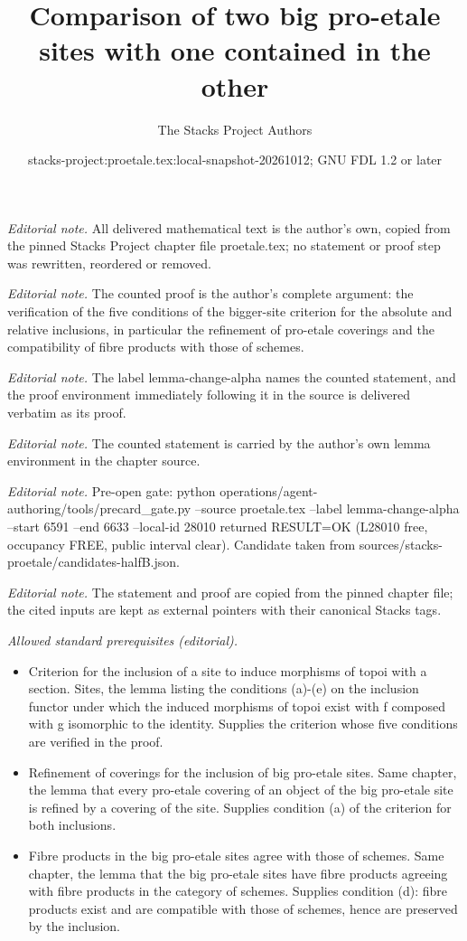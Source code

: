 \documentclass[10pt,a4paper]{amsart}
\title{Comparison of two big pro-etale sites with one contained in the other}
\author{The Stacks Project Authors}
\date{stacks-project:proetale.tex:local-snapshot-20261012; GNU FDL 1.2 or later}
\theoremstyle{plain}
\theoremstyle{definition}
\theoremstyle{remark}
\numberwithin{equation}{subsection}
\begin{document}
\maketitle
\noindent\textit{Editorial note.} All delivered mathematical text is the author's own, copied from the pinned Stacks Project chapter file proetale.tex; no statement or proof step was rewritten, reordered or removed.\par\medskip
\noindent\textit{Editorial note.} The counted proof is the author's complete argument: the verification of the five conditions of the bigger-site criterion for the absolute and relative inclusions, in particular the refinement of pro-etale coverings and the compatibility of fibre products with those of schemes.\par\medskip
\noindent\textit{Editorial note.} The label lemma-change-alpha names the counted statement, and the proof environment immediately following it in the source is delivered verbatim as its proof.\par\medskip
\noindent\textit{Editorial note.} The counted statement is carried by the author's own lemma environment in the chapter source.\par\medskip
\noindent\textit{Editorial note.} Pre-open gate: python operations/agent-authoring/tools/precard\_gate.py --source proetale.tex --label lemma-change-alpha --start 6591 --end 6633 --local-id 28010 returned RESULT=OK (L28010 free, occupancy FREE, public interval clear). Candidate taken from sources/stacks-proetale/candidates-halfB.json.\par\medskip
\noindent\textit{Editorial note.} The statement and proof are copied from the pinned chapter file; the cited inputs are kept as external pointers with their canonical Stacks tags.\par\medskip
\noindent\textit{Allowed standard prerequisites (editorial).}\begin{itemize}
\item Criterion for the inclusion of a site to induce morphisms of topoi with a section. Sites, the lemma listing the conditions (a)-(e) on the inclusion functor under which the induced morphisms of topoi exist with f composed with g isomorphic to the identity. Supplies the criterion whose five conditions are verified in the proof.
\item Refinement of coverings for the inclusion of big pro-etale sites. Same chapter, the lemma that every pro-etale covering of an object of the big pro-etale site is refined by a covering of the site. Supplies condition (a) of the criterion for both inclusions.
\item Fibre products in the big pro-etale sites agree with those of schemes. Same chapter, the lemma that the big pro-etale sites have fibre products agreeing with fibre products in the category of schemes. Supplies condition (d): fibre products exist and are compatible with those of schemes, hence are preserved by the inclusion.
\end{itemize}\medskip
\end{document}
